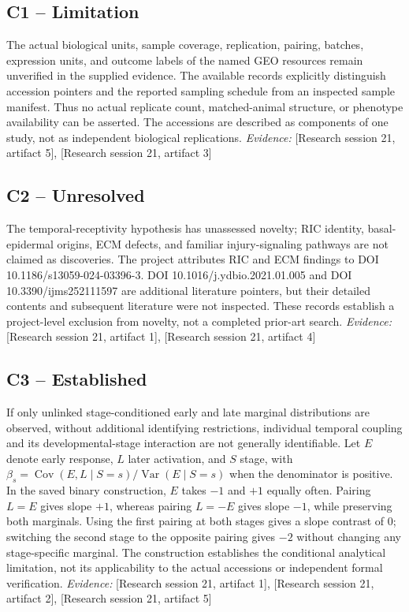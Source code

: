 \documentclass[11pt]{article}
\begin{document}
\subsection{C1 -- Limitation}
The actual biological units, sample coverage, replication, pairing, batches, expression units, and outcome labels of the named GEO resources remain unverified in the supplied evidence.
The available records explicitly distinguish accession pointers and the reported sampling schedule from an inspected sample manifest. Thus no actual replicate count, matched-animal structure, or phenotype availability can be asserted. The accessions are described as components of one study, not as independent biological replications.
\textit{Evidence: }[Research session 21, artifact 5], [Research session 21, artifact 3]
\subsection{C2 -- Unresolved}
The temporal-receptivity hypothesis has unassessed novelty; RIC identity, basal-epidermal origins, ECM defects, and familiar injury-signaling pathways are not claimed as discoveries.
The project attributes RIC and ECM findings to DOI 10.1186/s13059-024-03396-3. DOI 10.1016/j.ydbio.2021.01.005 and DOI 10.3390/ijms252111597 are additional literature pointers, but their detailed contents and subsequent literature were not inspected. These records establish a project-level exclusion from novelty, not a completed prior-art search.
\textit{Evidence: }[Research session 21, artifact 1], [Research session 21, artifact 4]
\subsection{C3 -- Established}
If only unlinked stage-conditioned early and late marginal distributions are observed, without additional identifying restrictions, individual temporal coupling and its developmental-stage interaction are not generally identifiable.
Let $E$ denote early response, $L$ later activation, and $S$ stage, with $\beta_s=\operatorname{Cov}(E,L\mid S=s)/\operatorname{Var}(E\mid S=s)$ when the denominator is positive. In the saved binary construction, $E$ takes $-1$ and $+1$ equally often. Pairing $L=E$ gives slope $+1$, whereas pairing $L=-E$ gives slope $-1$, while preserving both marginals. Using the first pairing at both stages gives a slope contrast of $0$; switching the second stage to the opposite pairing gives $-2$ without changing any stage-specific marginal. The construction establishes the conditional analytical limitation, not its applicability to the actual accessions or independent formal verification.
\textit{Evidence: }[Research session 21, artifact 1], [Research session 21, artifact 2], [Research session 21, artifact 5]
\end{document}
